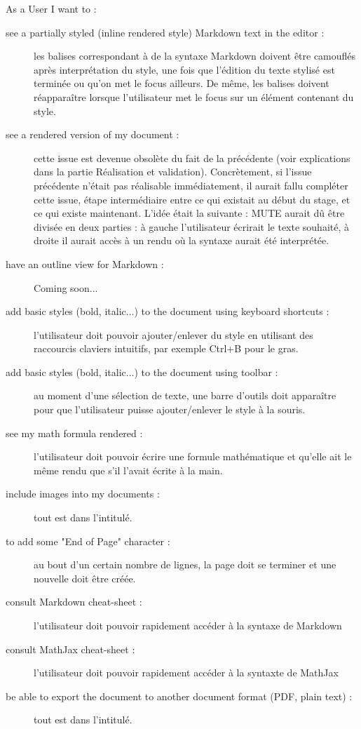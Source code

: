 \documentclass[12pt]{article}
\begin{document}
As a User I want to :
\begin{description}
    \item [see a partially styled (inline rendered style) Markdown text in the editor :]les balises correspondant à de la syntaxe Markdown doivent être camouflés après interprétation du style, une fois que l'édition du texte stylisé est terminée ou qu'on met le focus ailleurs. De même, les balises doivent réapparaître lorsque l'utilisateur met le focus sur un élément contenant du style.
    \item [see a rendered version of my document :]cette issue est devenue obsolète du fait de la précédente (voir explications dans la partie Réalisation et validation). Concrètement, si l'issue précédente n'était pas réalisable immédiatement, il aurait fallu compléter cette issue, étape intermédiaire entre ce qui existait au début du stage, et ce qui existe maintenant. L'idée était la suivante : MUTE aurait dû être divisée en deux parties : à gauche l'utilisateur écrirait le texte souhaité, à droite il aurait accès à un rendu où la syntaxe aurait été interprétée.
    \item [have an outline view for Markdown :] Coming soon...
    \item [add basic styles (bold, italic...) to the document using keyboard shortcuts :]l'utilisateur doit pouvoir ajouter/enlever du style en utilisant des raccourcis claviers intuitifs, par exemple Ctrl+B pour le gras.
    \item [add basic styles (bold, italic...) to the document using toolbar :]au moment d'une sélection de texte, une barre d'outils doit apparaître pour que l'utilisateur puisse ajouter/enlever le style à la souris.
    \item [see my math formula rendered :]l'utilisateur doit pouvoir écrire une formule mathématique et qu'elle ait le même rendu que s'il l'avait écrite à la main.
    \item [include images into my documents :]tout est dans l'intitulé.
    \item [to add some "End of Page" character :]au bout d'un certain nombre de lignes, la page doit se terminer et une nouvelle doit être créée.
    \item [consult Markdown cheat-sheet :]l'utilisateur doit pouvoir rapidement accéder à la syntaxe de Markdown
    \item [consult MathJax cheat-sheet :]l'utilisateur doit pouvoir rapidement accéder à la syntaxte de MathJax
    \item [be able to export the document to another document format (PDF, plain text) :]tout est dans l'intitulé.\\
\end{description}
\end{document}
